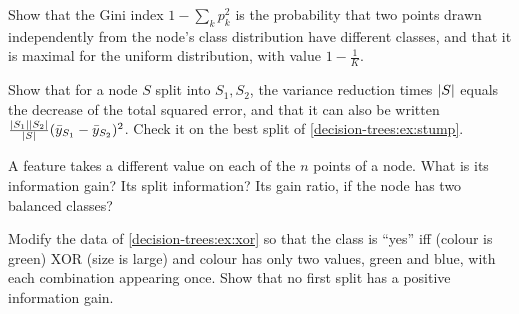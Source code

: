 \begin{notechapter}
\begin{exercise}\label{decision-trees:exr:1}
Show that the Gini index $1 - \sum_kp_k^2$ is the probability that two points drawn independently
from the node's class distribution have different classes, and that it is maximal for
the uniform distribution, with value $1 - \frac1K$.
\end{exercise}

\begin{exercise}\label{decision-trees:exr:2}
Show that for a node $S$ split into $S_1, S_2$, the variance reduction times $\left|S\right|$ equals the
decrease of the total squared error, and that it can also be written
$\frac{\left|S_1\right|\left|S_2\right|}{\left|S\right|}(\bar y_{S_1} - \bar y_{S_2})^2$. Check it on the best split of \cref{decision-trees:ex:stump}.
\end{exercise}

\begin{exercise}\label{decision-trees:exr:3}
A feature takes a different value on each of the $n$ points of a node. What is its
information gain? Its split information? Its gain ratio, if the node has two balanced
classes?
\end{exercise}

\begin{exercise}\label{decision-trees:exr:4}
Modify the data of \cref{decision-trees:ex:xor} so that the class is ``yes'' iff (colour is
green) XOR (size is large) and colour has only two values, green and blue, with each
combination appearing once. Show that no first split has a positive information gain.
\end{exercise}
\end{notechapter}
